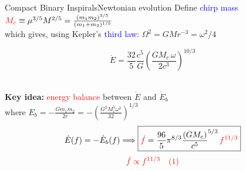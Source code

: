 \documentclass[xcolor=dvipsnames,handout,t]{beamer}
\newcommand{\red}[1]{\textcolor{red}{#1}}
\newcommand{\bl}[1]{\textcolor{blue}{#1}}
\newcommand{\f}{\frac}
\begin{document}
\begin{frame}{Compact Binary Inspirals}{Newtonian evolution}
 Define \bl{chirp mass} \hspace{1.cm} $\red{M_c} \equiv \mu^{3/5} M^{2/5} = \tfrac{(m_1 m_2)^{3/5}}{(m_1+m_2)^{1/5}}$ \\
 \vspace{1mm}
 which gives, using Kepler's \bl{third law}: $\Omega^2 = G M r^{-3}=\omega^2/4$   
 \begin{footnotesize}
  $$ \boxed{\dot{E} = \f{32}{5}\f{c^5}{G} \left(\f{G M_c\, \omega}{2c^3}\right)^{10/3}}$$
 \end{footnotesize}\\
%
{\bf Key idea:} \red{energy balance} between $\dot{E}$ and $\dot{E}_b$\\
\quad where $ E_b= -\tfrac{G m_1 m_2}{2r} = -\left(\tfrac{G^2 M_c^5 \omega^2}{32}\right)^{1/3} $
%
\[ 
 \dot{E}(f) = -\dot{E}_b(f) \Longrightarrow \boxed{\red{\dot{f}} = \f{96}{5}\pi^{8/3} \f{(G M_c)}{c^5}^{5/3}\, \red{f^{11/3}} }
 \]
\[
 \red{ \dot{f} \propto f^{11/3}\quad(1)}
\]


\end{frame}
\end{document}
